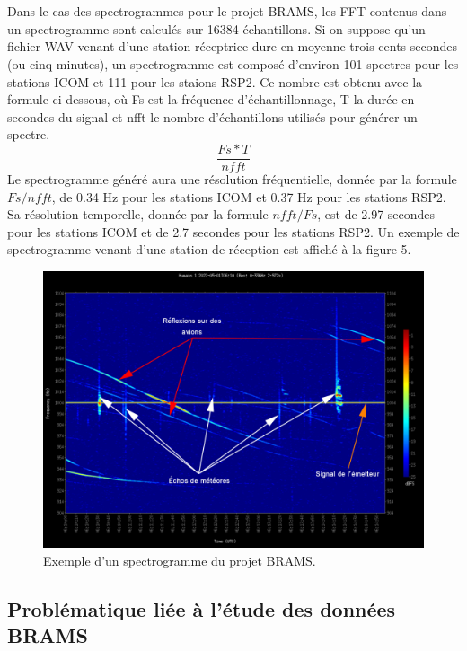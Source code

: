 \documentclass[11pt]{article}
\begin{document}
\\
\\
Dans le cas des spectrogrammes pour le projet BRAMS, les FFT contenus dans un spectrogramme sont calculés sur 16384 échantillons.
Si on suppose qu'un fichier WAV venant d'une station réceptrice dure en moyenne trois-cents secondes (ou cinq minutes), un spectrogramme est composé d'environ 101 spectres pour les stations ICOM et 111 pour les staions RSP2.
Ce nombre est obtenu avec la formule ci-dessous, où Fs est la fréquence d'échantillonnage, T la durée en secondes du signal et nfft le nombre d'échantillons utilisés pour générer un spectre.
\[\frac{Fs * T}{nfft}\]
Le spectrogramme généré aura une résolution fréquentielle, donnée par la formule \(Fs / nfft\), de 0.34 Hz pour les stations ICOM et 0.37 Hz pour les stations RSP2.
Sa résolution temporelle, donnée par la formule \(nfft / Fs\), est de 2.97 secondes pour les stations ICOM et de 2.7 secondes pour les stations RSP2.
Un exemple de spectrogramme venant d'une station de réception est affiché à la figure 5.

\begin{figure}[t]
    \begin{center}
        \includegraphics[scale=0.29]{spectrogramme_legend.png}
        \caption{Exemple d'un spectrogramme du projet BRAMS.}
    \end{center}
\end{figure}

\subsection{Problématique liée à l'étude des données BRAMS}
\end{document}
